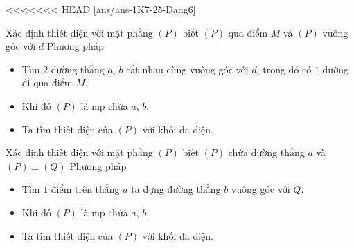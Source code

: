 <<<<<<< HEAD
[ans/ans-1K7-25-Dang6]
\begin{dang}{Xác định thiết diện với mặt phẳng $(P)$ biết $(P)$ qua điểm  $M$ và $(P)$ vuông góc với $d$}
	Phương pháp
	\begin{itemize}
		\item Tìm $2$ đường thẳng  $a$, $b$ cắt nhau cùng vuông góc với $d$, trong đó có $1$ đường đi qua điểm $M$.
		\item Khi đó $(P)$ là mp chứa $a$, $b$.
		\item Ta tìm thiết diện của $(P)$ với khối đa diện.
	\end{itemize}
\end{dang}
\begin{dang}{ Xác định thiết diện với mặt phẳng  $(P)$ biết $(P)$ chứa đường thẳng $a$  và  $(P)\perp (Q)$}
	Phương pháp
	\begin{itemize}
		\item Tìm $1$ điểm trên thẳng  $a$ ta dựng đường thẳng $b$ vuông góc với $Q$.
		\item Khi đó $(P)$ là mp chứa $a$, $b$.
		\item Ta tìm thiết diện của $(P)$ với khối đa diện.
	\end{itemize}
\end{dang}
